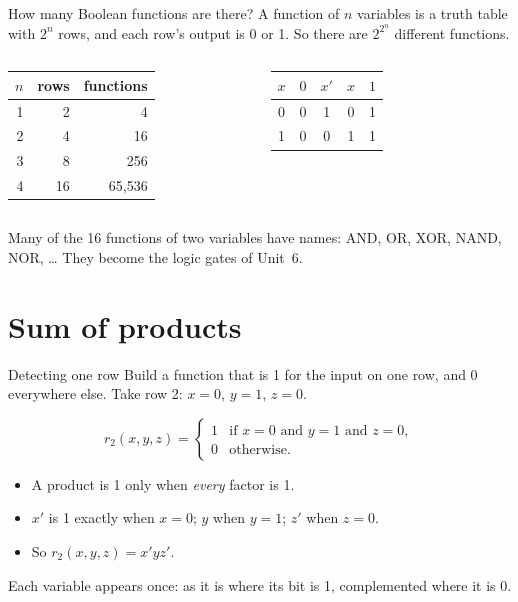 \documentclass[10pt]{wosm-slides}
\begin{document}
\begin{frame}{How many Boolean functions are there?}
  A function of $n$ variables is a truth table with $2^n$ rows, and each row's
  output is 0 or 1. So there are $2^{2^n}$ different functions.

  \medskip
  \begin{columns}[T, totalwidth=\textwidth]
      \centering
      \begin{tabular}{@{}rrr@{}}
        \toprule
        $n$ & rows & functions \\
        \midrule
        1 & 2 & 4 \\
        2 & 4 & 16 \\
        3 & 8 & 256 \\
        4 & 16 & 65,536 \\
        \bottomrule
      \end{tabular}
      \centering
      \par\smallskip
      \begin{tabular}{@{}c|cccc@{}}
        $x$ & $0$ & $x'$ & $x$ & $1$ \\
        \midrule
        0 & 0 & 1 & 0 & 1 \\
        1 & 0 & 0 & 1 & 1 \\
      \end{tabular}
  \end{columns}

  \bigskip
  Many of the 16 functions of two variables have names: AND, OR, XOR, NAND, NOR,
  \dots{} They become the logic gates of Unit~6.
\end{frame}

\section{Sum of products}

\begin{frame}{Detecting one row}
  Build a function that is 1 for the input on \alert{one} row, and 0 everywhere else.
  Take row 2: $x = 0$, $y = 1$, $z = 0$.

  \[
    r_2(x, y, z) =
      \begin{cases}
        1 & \text{if } x = 0 \text{ and } y = 1 \text{ and } z = 0, \\
        0 & \text{otherwise.}
      \end{cases}
  \]

  \begin{itemize}
    \item A product is 1 only when \emph{every} factor is 1.
    \item $x'$ is 1 exactly when $x = 0$; $y$ when $y = 1$; $z'$ when $z = 0$.
    \item So $r_2(x, y, z) = x'yz'$.
  \end{itemize}

  \medskip
  Each variable appears once: as it is where its bit is 1, complemented where it
  is 0.
\end{frame}
\end{document}
